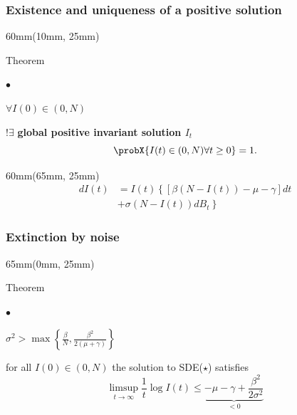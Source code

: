 \begin{frame}
    \frametitle{Existence and uniqueness of a positive solution}
    \begin{textblock*}{60mm}(10mm, 25mm)
        \begin{yellowbox}{Theorem}
            \begin{list}{$\bullet$}{}
                \item
                    $ \forall I(0) \in (0, N)$
            \end{list}
            \tcblower
             $! \exists$
             \textbf{global positive invariant solution %
             $I_t$} 
            $$
                \probX{I(t) \in (0, N) \forall t \geq 0} = 1.
            $$
        \end{yellowbox}
    \end{textblock*}
    \begin{textblock*}{60mm}(65mm, 25mm)
        \begin{align*}
            dI(t) &= 
                I(t)
                 \left\{
                     [
                         \beta (N - I(t))
                         -\mu - \gamma
                     ]
                     dt
                 \right.
                 \\
                  &+
                 \left.
                     \sigma (N-I(t))
                     dB_t
                 \right\}
        \end{align*}
    \end{textblock*}
\end{frame}
\begin{frame}
     \frametitle{Extinction by noise}
        \begin{textblock*}{65mm}(0mm, 25mm)
            \begin{yellowbox}{Theorem}
                \begin{list}{$\bullet$}{}
                    \item
                        $
                            \displaystyle
                            \sigma ^ 2 
                            >
                            \max
                            \left\{
                                \frac{\beta}{N},
                                \frac{\beta^2}{2(\mu + \gamma)}
                            \right\}
                        $
                \end{list}
                \tcblower
                for all $I(0)\in (0, N)$ the solution to SDE($\star$)
                satisfies
                $$
                    \limsup_{t \to \infty} 
                        \frac{1}{t} \log I(t)
                        \leq
                        \underbrace{
                        -\mu - \gamma 
                        + \frac{\beta^2}{2 \sigma ^ 2}
                        }_{<0}
                $$
            \end{yellowbox}
        \end{textblock*}
\end{frame}
